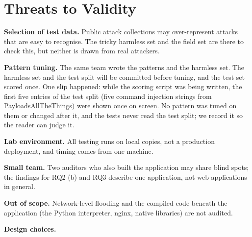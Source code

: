 \section{Threats to Validity}

\textbf{Selection of test data.} Public attack collections may over-represent attacks that are easy to recognise. The tricky harmless set and the field set are there to check this, but neither is drawn from real attackers.

\textbf{Pattern tuning.} The same team wrote the patterns and the harmless set. The harmless set and the test split will be committed before tuning, and the test set scored once.  One slip happened: while the scoring script was being written, the first five entries of the test split (five command injection strings from PayloadsAllTheThings) were shown once on screen. No pattern was tuned on them or changed after it, and the tests never read the test split; we record it so the reader can judge it.

\textbf{Lab environment.} All testing runs on local copies, not a production deployment, and timing comes from one machine.

\textbf{Small team.} Two auditors who also built the application may share blind spots; the findings for RQ2 (b) and RQ3 describe one application, not web applications in general.

\textbf{Out of scope.} Network-level flooding and the compiled code beneath the application (the Python interpreter, nginx, native libraries) are not audited.

\textbf{Design choices.} 
